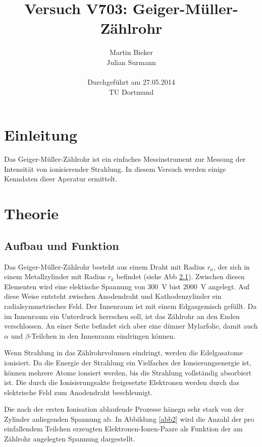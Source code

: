 \documentclass[11pt,ngerman,a4paper]{article}
\title{\textbf{Versuch V703: Geiger-Müller-Zählrohr}}
\author{Martin Bieker\\
		Julian Surmann\\
		\\
		Durchgef\"{u}hrt am 27.05.2014\\
		TU Dortmund}
\date{}
\begin{document}
\renewcommand\tablename{Tabelle}
\renewcommand\figurename{Abbildung}
\maketitle
\thispagestyle{empty}
\newpage
\clearpage
\setcounter{page}{1}


\section{Einleitung}
Das Geiger-Müller-Zählrohr ist ein einfaches Messinstrument zur Messung der Intensität von ionisierender Strahlung. In diesem Versuch werden einige Kenndaten dieer Aperatur ermittelt.
\section{Theorie}
\subsection{Aufbau und Funktion} 
 Das Geiger-M\"uller-Z\"ahlrohr besteht aus einem Draht  mit Radius $r_a$, der sich in einem Metallzylinder mit Radius $r_k$ befindet (siehe Abb \ref{}). Zwischen diesen Elementen wird eine elektische Spannung von \SI{300}{\volt} bist \SI{2000}{\volt} angelegt. Auf diese Weise entsteht zwischen Anodendraht und Kathodenzylinder ein radialsymmetrisches Feld. Der Innenraum ist mit einem  Edgasgemisch gef\"ullt. Da im Innenraum ein Unterdruck herrschen soll, ist das Z\"ahlrohr an den Enden verschlossen. An einer Seite befindet sich aber eine d\"unner Mylarfolie, damit  auch $\alpha$ und $\beta$-Teilchen in den Innenraum eindringen k\"onnen.
 
 \noindent
 Wenn Strahlung in das Z\"ahlrohrvolumen eindringt, werden die Edelgasatome ionisiert. Da die Energie der Strahlung ein Vielfaches der Ionsierungsenergie ist, k\"onnen mehrere Atome ionsiert werden, bis die Strahlung vollst\"andig absorbiert ist. Die durch die Ionisierungsakte freigesetzte Elektronen werden durch das elektrische Feld  zum Anodendraht beschleunigt.

Die nach der ersten Ionisation ablaufende Prozesse h\"anegn sehr stark von der Zylinder anliegenden Spannung ab. In Abbildung \ref{abb2} wird die Anzahl der pro einfallendem Teilchen erzeugten Elektronen-Ionen-Paare als Funktion der am Z\"ahlrohr angelegten Spannung dargestellt.
\end{document}

